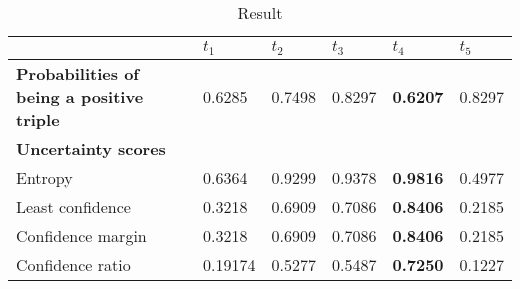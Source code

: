 \begin{table}[h]
    \centering
    \begin{tabular}{llllll}
        \toprule
        
        &  \textbf{$t_1$} & \textbf{$t_2$} & \textbf{$t_3$} & \textbf{$t_4$} & \textbf{$t_5$} \\
         
        \midrule
        
         \textbf{Probabilities of being a positive triple}
        & 0.6285 & 0.7498 & 0.8297 & \textbf{0.6207} & 0.8297   \\
        
        \midrule
        \textbf{Uncertainty scores}
        & & & & & \\
        
        Entropy 
        & 0.6364 & 0.9299 & 0.9378 & \textbf{0.9816} & 0.4977 \\
        
        Least confidence 
        & 0.3218 & 0.6909 & 0.7086 & \textbf{0.8406} & 0.2185 \\
        
        Confidence margin
        & 0.3218 & 0.6909 & 0.7086 & \textbf{0.8406} & 0.2185 \\
        
        Confidence ratio
        & 0.19174 & 0.5277 & 0.5487 & \textbf{0.7250} & 0.1227\\
        
        \bottomrule
    \end{tabular}
    \caption{Result}
\label{tab:uncertainty_metrics_example_max}
\end{table}